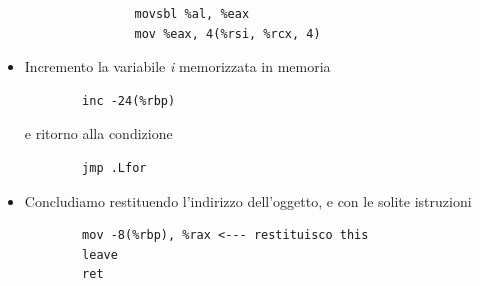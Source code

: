 \begin{itemize}
\begin{itemize}
\begin{verbatim}
			movsbl %al, %eax
			mov %eax, 4(%rsi, %rcx, 4)
		\end{verbatim}
	\end{itemize}
	\item Incremento la variabile \emph{i} memorizzata in memoria
	\begin{verbatim}
		inc -24(%rbp)
	\end{verbatim}
	e ritorno alla condizione
	\begin{verbatim}
		jmp .Lfor
	\end{verbatim}
	\item Concludiamo restituendo l'indirizzo dell'oggetto, e con le solite istruzioni
	\begin{verbatim}
		mov -8(%rbp), %rax <--- restituisco this
		leave
		ret
	\end{verbatim}
\end{itemize}
